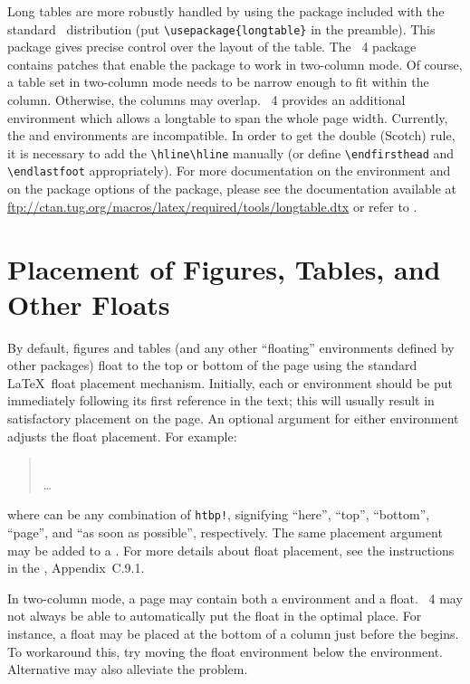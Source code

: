 \documentclass[%
 ,twocolumn%
 ,secnumarabic%
,amssymb, amsmath,nobibnotes, aps, prl]{revtex4}
\begin{document}
Long tables are more robustly handled by using the
 package included with the standard \LaTeXe\
distribution (put \verb+\usepackage{longtable}+ in the preamble). This
package gives precise control over the layout of the table.
The \revtex~4 package contains patches that enable the
 package to work in two-column mode. Of course, a
table set in two-column mode needs to be narrow enough to fit within
the column. Otherwise, the columns may overlap. \revtex~4 provides
an additional environment  which allows a longtable to
span the whole page width. Currently, the \env{longtable*} and
 environments are incompatible. In order to get the
double (Scotch) rule, it is necessary to add the \verb+\hline\hline+
manually (or define \verb+\endfirsthead+ and \verb+\endlastfoot+
appropriately).  For more documentation on the \env{longtable}
environment and on the package options of the
 package, please see the documentation available at
\url{ftp://ctan.tug.org/macros/latex/required/tools/longtable.dtx} or
refer to \cite{Compan}.

\section{Placement of Figures, Tables, and Other Floats}
\label{sec:place}

By default, figures and tables (and any other ``floating'' environments
defined by other packages) float to the top or bottom of the page
using the standard \LaTeX\ float placement mechanism.  Initially, each
\env{figure} or \env{table} environment should be put immediately
following its first reference in the text; this will usually result in
satisfactory placement on the page.  An optional argument for either 
environment adjusts the float placement. For example:
\begin{quote}
\\
\dots\\
\end{quote}
where  can be any combination of \verb|htbp!|, signifying
``here'', ``top'', ``bottom'', ``page'', and ``as soon as possible'',
respectively. The same placement argument may be added to a
. For more details about float placement, 
see the instructions in the \LUG, Appendix~C.9.1.

In two-column mode, a page may contain both a 
environment and a float. \revtex~4 may not always be able to
automatically put the float in the optimal place. For instance, a
float may be placed at the bottom of a column just before the
 begins. To workaround this, try moving the float
environment below the \env{widetext} environment. Alternative
 may also alleviate the problem.
\end{document}
